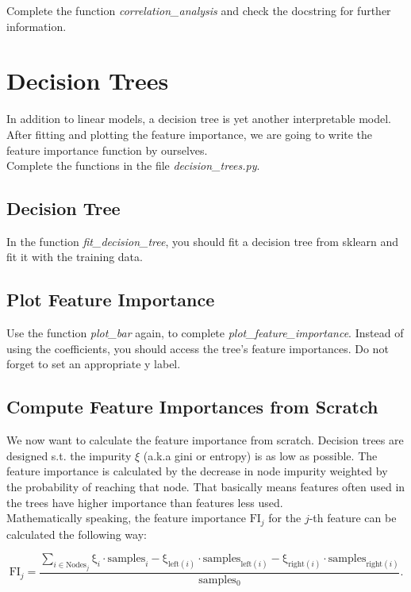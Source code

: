 \documentclass[a4paper]{article}
\begin{document}
\noindent Complete the function \textit{correlation\_analysis} and check the docstring for further information.


\section{Decision Trees}

In addition to linear models, a decision tree is yet another interpretable model. After fitting and plotting the feature importance, we are going to write the feature importance function by ourselves.\\

\noindent Complete the functions in the file \textit{decision\_trees.py}.

\subsection{Decision Tree}

In the function \textit{fit\_decision\_tree}, you should fit a decision tree from sklearn and fit it with the training data.

\subsection{Plot Feature Importance}

Use the function \textit{plot\_bar} again, to complete \textit{plot\_feature\_importance}. Instead of using the coefficients, you should access the tree's feature importances. Do not forget to set an appropriate y label.


\subsection{Compute Feature Importances from Scratch}

We now want to calculate the feature importance from scratch. Decision trees are designed s.t. the impurity $\xi$ (a.k.a gini or entropy) is as low as possible. The feature importance is calculated by the decrease in node impurity weighted by the probability of
reaching that node. That basically means features often used in the trees have higher importance than features less used.\\

\noindent Mathematically speaking, the feature importance $\mathrm{FI}_j$ for the $j$-th feature can be
calculated the following way:

\begin{equation}
\mathrm{FI}_j = \dfrac
{
    \sum_{i \in \mathrm{Nodes}_j}
    \mathrm{\xi}_i \cdot \mathrm{samples}_i -
    \mathrm{\xi}_{\mathrm{left}(i)} \cdot \mathrm{samples}_{\mathrm{left}(i)} -
    \mathrm{\xi}_{\mathrm{right}(i)} \cdot \mathrm{samples}_{\mathrm{right}(i)}
}  
{
    \mathrm{samples_0}
}.
\end{equation}
\end{document}
